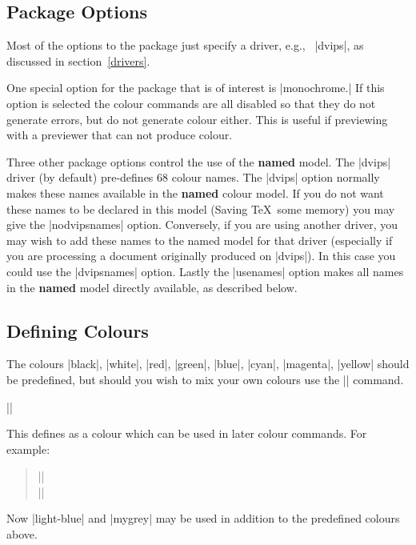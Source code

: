 \subsection{Package Options}
Most of the options to the  package just specify a
driver, e.g., \ |dvips|, as discussed in section~\ref{drivers}.

One special option for the  package
that is of interest is |monochrome.|
If this option is selected the colour commands are all
disabled so that they do not generate errors, but do not generate colour
either. This is useful if previewing with a previewer that can not
produce colour.

Three other package options control the use of the \textbf{named} model.
The |dvips| driver (by default) pre-defines 68 colour names. The |dvips|
option normally makes these names available in the \textbf{named} colour
model. If you do not want these names to be declared in  this model
(Saving \TeX\ some memory) you may give the |nodvipsnames|
option. Conversely, if you are using another driver, you may wish to
add these names to the named model for that driver (especially if you
are processing a document originally produced on |dvips|). In this case
you could use the |dvipsnames| option. Lastly the |usenames| option
makes all names in the \textbf{named} model directly available, as
described below.

\subsection{Defining Colours}

The colours |black|, |white|, |red|, |green|, |blue|, |cyan|,
|magenta|, |yellow| should be predefined, but should you wish to mix
your own colours use the |\definecolor| command.

\begin{decl}
|\definecolor|
\end{decl}


This defines  as a colour which can be used in later colour
commands. For example:
\begin{quote}
  || \\
  ||
\end{quote}

Now |light-blue| and |mygrey| may be used in addition to the
predefined colours above.

